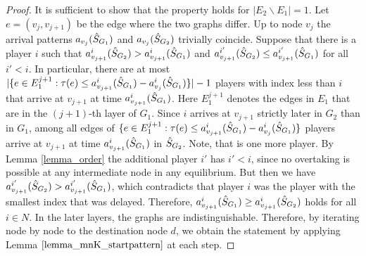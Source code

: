\begin{proof}
It is sufficient to show that the property holds for $|E_2\backslash E_1|=1$. Let $e=(v_j,v_{j+1})$ be the edge where the two graphs differ. Up to node $v_j$ the arrival patterns $a_{v_j}(\hat{S}_{G_1})$ and $a_{v_j}(\hat{S}_{G_2})$ trivially coincide.
Suppose that there is a player $i$ such that $a^i_{v_{j+1}}(\hat{S}_{G_2}) > a^i_{v_{j+1}}(\hat{S}_{G_1})$ and $a^{i'}_{v_{j+1}}(\hat{S}_{G_2}) \leq a^{i'}_{v_{j+1}}(\hat{S}_{G_1})$ for all $i'<i$. In particular, there are at most $|\{e\in E_1^{j+1}: \tau(e) \leq a^i_{v_{j+1}}(\hat{S}_{G_1}) - a^i_{v_{j}}(\hat{S}_{G_1})\}| -1$ players with index less than $i$ that arrive at $v_{j+1}$ at time $a^i_{v_{j+1}}(\hat{S}_{G_1})$. Here $E_1^{j+1}$ denotes the edges in $E_1$ that are in the $(j+1)$-th layer of $G_1$. Since $i$ arrives at $v_{j+1}$ strictly later in $G_2$ than in $G_1$, among all edges of $\{e\in E_1^{j+1}: \tau(e) \leq a^i_{v_{j+1}}(\hat{S}_{G_1}) - a^i_{v_{j}}(\hat{S}_{G_1})\}$ players arrive at $v_{j+1}$ at time $a^i_{v_{j+1}}(\hat{S}_{G_1})$ in $\hat{S}_{G_2}$. Note, that is one more player. By Lemma \ref{lemma_order} the additional player $i'$ has $i'<i$, since no overtaking is possible at any intermediate node in any equilibrium. But then we have $a^{i'}_{v_{j+1}}(\hat{S}_{G_2}) > a^{i'}_{v_{j+1}}(\hat{S}_{G_1})$, which contradicts that player $i$ was the player with the smallest index that was delayed. Therefore, $a^i_{v_{j+1}}(\hat{S}_{G_1}) \geq a^i_{v_{j+1}}(\hat{S}_{G_2})$ holds for all $i\in N$.
In the later layers, the graphs are indistinguishable. Therefore, by iterating node by node to the destination node $d$, we obtain the statement by applying Lemma $\ref{lemma_mnK_startpattern}$ at each step.
\end{proof}